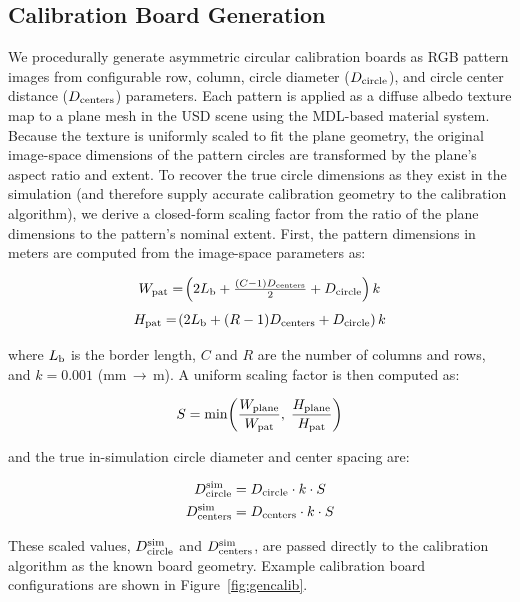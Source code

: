 \documentclass[journal,twoside,web]{ieeecolor}
\begin{document}
\subsection{Calibration Board Generation}

We procedurally generate asymmetric circular calibration boards as RGB pattern images from
configurable row, column, circle diameter ($D_{\rm circle}$), and circle center distance
($D_{\rm centers}$) parameters.
Each pattern is applied as a diffuse albedo texture map to a plane mesh in the USD scene
using the MDL-based material system.
Because the texture is uniformly scaled to fit the plane geometry, the original image-space
dimensions of the pattern circles are transformed by the plane's aspect ratio and extent.
To recover the true circle dimensions as they exist in the simulation (and
therefore supply accurate calibration geometry to the calibration algorithm), we derive
a closed-form scaling factor from the ratio of the plane dimensions to the pattern's
nominal extent.
First, the pattern dimensions in meters are computed from the image-space parameters as:

\begin{equation}
W_{\rm pat} = \!\left(2L_{\rm b} + \tfrac{(C-1)D_{\rm centers}}{2} + D_{\rm circle}\right)k
\end{equation}
\begin{equation}
H_{\rm pat} = \!\left(2L_{\rm b} + (R-1)D_{\rm centers} + D_{\rm circle}\right)k
\end{equation}

\noindent where $L_{\rm b}$ is the border length, $C$ and $R$ are the number of columns
and rows, and $k = 0.001$ (mm$\,\to\,$m).
A uniform scaling factor is then computed as:

\begin{equation}
S = \min\!\left(\frac{W_{\rm plane}}{W_{\rm pat}},\;\frac{H_{\rm plane}}{H_{\rm pat}}\right)
\end{equation}

\noindent and the true in-simulation circle diameter and center spacing are:

\begin{align}
D_{\rm circle}^{\rm sim} &= D_{\rm circle}\cdot k \cdot S \\
D_{\rm centers}^{\rm sim} &= D_{\rm centers}\cdot k \cdot S
\end{align}

\noindent These scaled values, $D_{\rm circle}^{\rm sim}$ and $D_{\rm centers}^{\rm sim}$,
are passed directly to the calibration algorithm as the known board geometry.
Example calibration board configurations are shown in Figure~\ref{fig:gencalib}.
\end{document}
